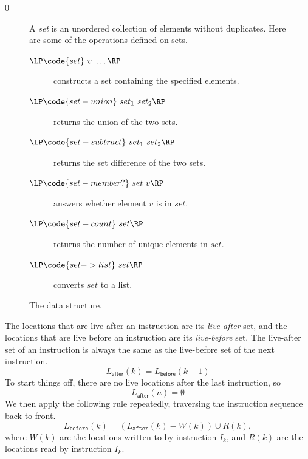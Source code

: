 \documentclass[7x10]{TimesAPriori_MIT}%
\def\racketEd{0}
\def\edition{1}
\numberwithin{theorem}{chapter}
\numberwithin{definition}{chapter}
\numberwithin{equation}{chapter}
\begin{document}
{\if\edition\racketEd
\begin{figure}[tp]
  \small
  \begin{tcolorbox}[title=\href{https://docs.racket-lang.org/reference/sets.html}{The Racket Set Package}]
    A \emph{set} is an unordered collection of elements without duplicates.
    Here are some of the operations defined on sets.
  \begin{description}
  \item[$\LP\code{set}~v~\ldots\RP$] constructs a set containing the specified elements.
  \item[$\LP\code{set-union}~set_1~set_2\RP$] returns the union of the two sets.
  \item[$\LP\code{set-subtract}~set_1~set_2\RP$] returns the set
    difference of the two sets.
  \item[$\LP\code{set-member?}~set~v\RP$] answers whether element $v$ is in $set$.
  \item[$\LP\code{set-count}~set\RP$] returns the number of unique elements in $set$.
  \item[$\LP\code{set->list}~set\RP$] converts $set$ to a list.
  \end{description}
  \end{tcolorbox}
  \caption{The  data structure.}
  \label{fig:set}
\end{figure}
\fi}


The locations that are live after an instruction are its
\emph{live-after} set, and the locations
that are live before an instruction are its
\emph{live-before} set. The live-after
set of an instruction is always the same as the live-before set of the
next instruction.
\begin{equation} \label{eq:live-after-before-next}
  L_{\mathsf{after}}(k) = L_{\mathsf{before}}(k+1)
\end{equation}
To start things off, there are no live locations after the last
instruction, so
\begin{equation}\label{eq:live-last-empty}
  L_{\mathsf{after}}(n) = \emptyset
\end{equation}
We then apply the following rule repeatedly, traversing the
instruction sequence back to front.
\begin{equation}\label{eq:live-before-after-minus-writes-plus-reads}
  L_{\mathtt{before}}(k) = (L_{\mathtt{after}}(k) - W(k)) \cup R(k),
\end{equation}
where $W(k)$ are the locations written to by instruction $I_k$, and
$R(k)$ are the locations read by instruction $I_k$.
\end{document}
